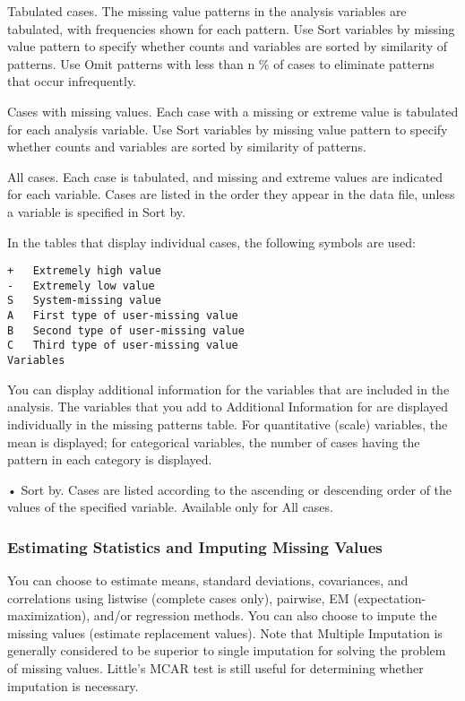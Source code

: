 \documentclass[a4paper,12pt]{article}
\begin{document}
Tabulated cases. The missing value patterns in the analysis variables are tabulated, with frequencies shown for each pattern. Use Sort variables by missing value pattern to specify whether counts and variables are sorted by similarity of patterns. Use Omit patterns with less than n \% of cases to eliminate patterns that occur infrequently.

Cases with missing values. Each case with a missing or extreme value is tabulated for each analysis variable. Use Sort variables by missing value pattern to specify whether counts and variables are sorted by similarity of patterns.

All cases. Each case is tabulated, and missing and extreme values are indicated for each variable. Cases are listed in the order they appear in the data file, unless a variable is specified in Sort by.

In the tables that display individual cases, the following symbols are used:
\begin{framed}
\begin{verbatim}
+	Extremely high value
-	Extremely low value
S	System-missing value
A	First type of user-missing value
B	Second type of user-missing value
C	Third type of user-missing value
Variables
\end{verbatim}
\end{framed}
You can display additional information for the variables that are included in the analysis. The variables that you add to Additional Information for are displayed individually in the missing patterns table. For quantitative (scale) variables, the mean is displayed; for categorical variables, the number of cases having the pattern in each category is displayed.

• Sort by. Cases are listed according to the ascending or descending order of the values of the specified variable. Available only for All cases.

\subsubsection*{Estimating Statistics and Imputing Missing Values}

You can choose to estimate means, standard deviations, covariances, and correlations using listwise (complete cases only), pairwise, EM (expectation-maximization), and/or regression methods. You can also choose to impute the missing values (estimate replacement values). Note that Multiple Imputation is generally considered to be superior to single imputation for solving the problem of missing values. Little's MCAR test is still useful for determining whether imputation is necessary.
\end{document}
